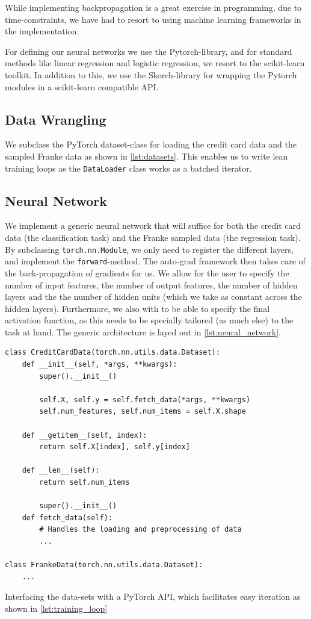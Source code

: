 \documentclass[a4paper, 11pt, oneside, article]{memoir}
\begin{document}
	While implementing backpropagation is a great exercise in programming,
	due to time-constraints, we have had to resort to using machine
	learning frameworks in the implementation.

	For defining our neural networks we use the Pytorch-library, and for
	standard methods like linear regression and logistic regression, we
	resort to the scikit-learn toolkit. In addition to this, we use the
	Skorch-library for wrapping the Pytorch modules in a scikit-learn
	compatible API.

	\subsection{Data Wrangling}
	
	We subclass the PyTorch dataset-class for loading the credit card data
	and the sampled Franke data as shown in \cref{lst:datasets}. This
	enables us to write lean training loops as the \texttt{DataLoader}
	class works as a batched iterator.

	\subsection{Neural Network}	
	
	We implement a generic neural network that will suffice for both the
	credit card data (the classification task) and the Franke sampled data
	(the regression task). By subclassing \texttt{torch.nn.Module}, we only
	need to register the different layers, and implement the
	\texttt{forward}-method. The auto-grad framework then takes care of the
	back-propagation of gradients for us. We allow for the user to specify
	the number of input features, the number of output features, the number
	of hidden layers and the the number of hidden units (which we take as
	constant across the hidden layers). Furthermore, we also with to be
	able to specify the final activation function, as this needs to be
	specially tailored (as much else) to the task at hand. The generic
	architecture is layed out in \cref{lst:neural_network}.
	
	\begin{listing}
	\begin{verbatim}
class CreditCardData(torch.nn.utils.data.Dataset):
	def __init__(self, *args, **kwargs):
		super().__init__()
		
		self.X, self.y = self.fetch_data(*args, **kwargs)
		self.num_features, self.num_items = self.X.shape

	def __getitem__(self, index):
		return self.X[index], self.y[index]

	def __len__(self):
		return self.num_items

		super().__init__()	
	def fetch_data(self):
		# Handles the loading and preprocessing of data
		...

class FrankeData(torch.nn.utils.data.Dataset):
	...
	\end{verbatim}
	\caption{Interfacing the data-sets with a PyTorch API, which facilitates easy iteration as shown in \cref{lst:training_loop}}
	\label{lst:datasets}
	\end{listing}
	
\end{document}
